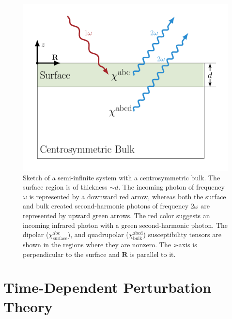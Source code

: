 \begin{figure}[t]
\centering
\includegraphics[scale=0.6]{content/figures/diag-system}
\caption[Sketch of a semi-infinite system with a centrosymmetric bulk.]
{Sketch of a semi-infinite system with a centrosymmetric bulk. The surface
region is of thickness $\sim d$. The incoming photon of frequency $\omega$ is
represented by a downward red arrow, whereas both the surface and bulk created
second-harmonic photons of frequency $2\omega$ are represented by upward green
arrows. The red color suggests an incoming infrared photon with a green
second-harmonic photon. The dipolar ($\chi^{\mathrm{abc}}_{\mathrm{surface}}$),
and quadrupolar ($\chi^{\mathrm{abcd}}_{\mathrm{bulk}}$) susceptibility tensors
are shown in the regions where they are nonzero. The $z$-axis is perpendicular
to the surface and $\mathbf{R}$ is parallel to it.}
\label{fig:fsystem}
\end{figure}



\section{Time-Dependent Perturbation Theory}\label{tdpt}

